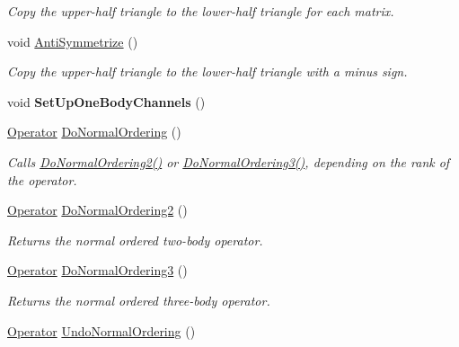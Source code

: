 \begin{DoxyCompactItemize}
\begin{DoxyCompactList}\small\item\em Copy the upper-\/half triangle to the lower-\/half triangle for each matrix. \end{DoxyCompactList}\item 
\hypertarget{classOperator_a21a37daa051c248109153e6502b8280f}{void \hyperlink{classOperator_a21a37daa051c248109153e6502b8280f}{Anti\-Symmetrize} ()}\label{classOperator_a21a37daa051c248109153e6502b8280f}

\begin{DoxyCompactList}\small\item\em Copy the upper-\/half triangle to the lower-\/half triangle with a minus sign. \end{DoxyCompactList}\item 
\hypertarget{classOperator_ad6168f16f6c0b2cf70a1fc0676e70523}{void {\bfseries Set\-Up\-One\-Body\-Channels} ()}\label{classOperator_ad6168f16f6c0b2cf70a1fc0676e70523}

\item 
\hypertarget{classOperator_a622880b91a902c832b867c6447a262e7}{\hyperlink{classOperator}{Operator} \hyperlink{classOperator_a622880b91a902c832b867c6447a262e7}{Do\-Normal\-Ordering} ()}\label{classOperator_a622880b91a902c832b867c6447a262e7}

\begin{DoxyCompactList}\small\item\em Calls \hyperlink{classOperator_a652d989590422a2b26e662625b07254e}{Do\-Normal\-Ordering2()} or \hyperlink{classOperator_a7fd029569796107c87ff17c5a7912480}{Do\-Normal\-Ordering3()}, depending on the rank of the operator. \end{DoxyCompactList}\item 
\hyperlink{classOperator}{Operator} \hyperlink{classOperator_a652d989590422a2b26e662625b07254e}{Do\-Normal\-Ordering2} ()
\begin{DoxyCompactList}\small\item\em Returns the normal ordered two-\/body operator. \end{DoxyCompactList}\item 
\hyperlink{classOperator}{Operator} \hyperlink{classOperator_a7fd029569796107c87ff17c5a7912480}{Do\-Normal\-Ordering3} ()
\begin{DoxyCompactList}\small\item\em Returns the normal ordered three-\/body operator. \end{DoxyCompactList}\item 
\hypertarget{classOperator_a1932dcab2be6bb889320254cc81dd5f4}{\hyperlink{classOperator}{Operator} \hyperlink{classOperator_a1932dcab2be6bb889320254cc81dd5f4}{Undo\-Normal\-Ordering} ()}\label{classOperator_a1932dcab2be6bb889320254cc81dd5f4}


\end{DoxyCompactItemize}
